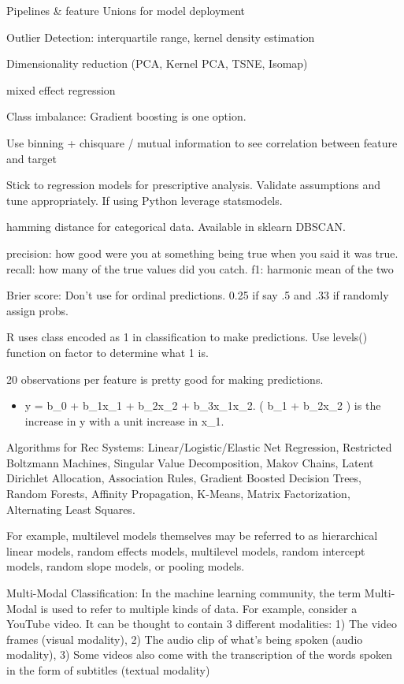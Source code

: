 \documentclass[]{book}
\providecommand{\tightlist}{%
  \setlength{\itemsep}{0pt}\setlength{\parskip}{0pt}}
\begin{document}
Pipelines \& feature Unions for model deployment

Outlier Detection: interquartile range, kernel density estimation

Dimensionality reduction (PCA, Kernel PCA, TSNE, Isomap)

mixed effect regression

Class imbalance: Gradient boosting is one option.

Use binning + chisquare / mutual information to see correlation between feature and target

Stick to regression models for prescriptive analysis. Validate assumptions and tune appropriately. If using Python leverage statsmodels.

hamming distance for categorical data. Available in sklearn DBSCAN.

precision: how good were you at something being true when you said it was true. recall: how many of the true values did you catch. f1: harmonic mean of the two

Brier score: Don't use for ordinal predictions. 0.25 if say .5 and .33 if randomly assign probs.

R uses class encoded as 1 in classification to make predictions. Use levels() function on factor to determine what 1 is.

20 observations per feature is pretty good for making predictions.

\begin{itemize}
\tightlist
\item
  y = b\_0 + b\_1x\_1 + b\_2x\_2 + b\_3x\_1x\_2. ( b\_1 + b\_2x\_2 ) is the increase in y with a unit increase in x\_1.
\end{itemize}

Algorithms for Rec Systems: Linear/Logistic/Elastic Net Regression, Restricted Boltzmann Machines, Singular Value Decomposition, Makov Chains, Latent Dirichlet Allocation, Association Rules, Gradient Boosted Decision Trees, Random Forests, Affinity Propagation, K-Means, Matrix Factorization, Alternating Least Squares.

For example, multilevel models themselves may be referred to as hierarchical linear models, random effects models, multilevel models, random intercept models, random slope models, or pooling models.

Multi-Modal Classification: In the machine learning community, the term Multi-Modal is used to refer to multiple kinds of data. For example, consider a YouTube video. It can be thought to contain 3 different modalities: 1) The video frames (visual modality), 2) The audio clip of what's being spoken (audio modality), 3) Some videos also come with the transcription of the words spoken in the form of subtitles (textual modality)
\end{document}
